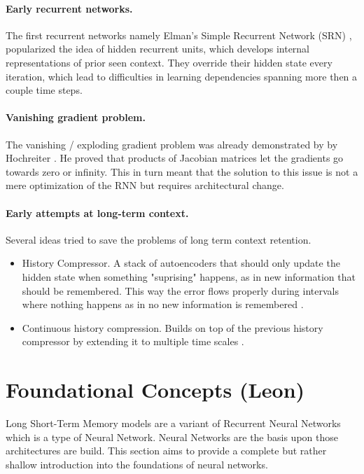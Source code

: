 \documentclass[twoside,a4paper,10pt,DIV=12,BCOR=12mm]{scrartcl}
\begin{document}
\paragraph{Early recurrent networks.} The first recurrent networks namely Elman's Simple Recurrent Network (SRN) \cite{Elman90},
popularized the idea of hidden recurrent units, which develops internal representations of prior seen context.
They override their hidden state every iteration, which lead to difficulties in learning dependencies spanning more then
a couple time steps.

\paragraph{Vanishing gradient problem.} The vanishing / exploding gradient problem was already demonstrated by by Hochreiter \cite{hochreiter1991}.
He proved that products of Jacobian matrices let the gradients go towards zero or infinity. This in turn meant that the solution to
this issue is not a mere optimization of the RNN but requires architectural change.

\paragraph{Early attempts at long-term context.} Several ideas tried to save the problems of long term context retention.

\begin{itemize}
  \item{History Compressor.} A stack of autoencoders that should only update the hidden state when something 
    "suprising" happens, as in new information that should be remembered. This way the error flows properly during 
    intervals where nothing happens as in no new information is remembered \cite{Schmidhuber92}.
  \item{Continuous history compression.} Builds on top of the previous history compressor by extending it to 
    multiple time scales \cite{Schmidhuber93}.
\end{itemize}


\section{Foundational Concepts (Leon)}

Long Short-Term Memory models are a variant of Recurrent Neural Networks which is a type of Neural Network.
Neural Networks are the basis upon those architectures are build. This section aims to
provide a complete but rather shallow introduction into the foundations of neural networks.
\end{document}
